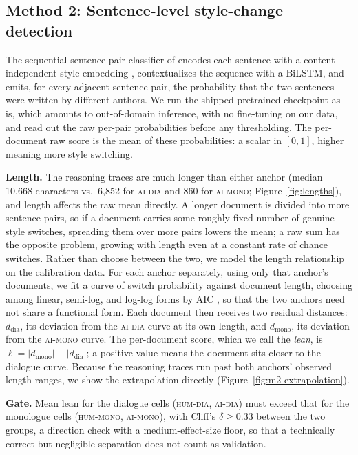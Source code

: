 \documentclass[11pt]{article}
\newcommand{\cellhm}{\textsc{hum-mono}}
\newcommand{\cellhd}{\textsc{hum-dia}}
\newcommand{\cellad}{\textsc{ai-dia}}
\newcommand{\cellam}{\textsc{ai-mono}}
\begin{document}
\subsection{Method 2: Sentence-level style-change detection}
\label{sec:method2}

The sequential sentence-pair classifier of \citet{schmidt2025sspc} encodes
each sentence with a content-independent style embedding
\citep{patel2025styledistance}, contextualizes the sequence with a BiLSTM,
and emits, for every adjacent sentence pair, the probability that the two
sentences were written by different authors. We run the shipped pretrained
checkpoint as is, which amounts to out-of-domain inference, with no
fine-tuning on our data, and read out the raw per-pair probabilities before
any thresholding.
The per-document raw score is the mean of these probabilities: a scalar in
$[0,1]$, higher meaning more style switching.

\textbf{Length.} The reasoning traces are much longer than either anchor
(median 10{,}668 characters vs.\ 6{,}852 for \cellad{} and 860 for \cellam{};
Figure~\ref{fig:lengths}), and length affects the raw mean directly. A longer
document is divided into more sentence pairs, so if a document carries some
roughly fixed number of genuine style switches, spreading them over more pairs
lowers the mean; a raw sum has the opposite problem, growing with length even
at a constant rate of chance switches. Rather than choose between the two, we
model the length relationship on the calibration data. For each anchor
separately, using only that anchor's documents, we fit a curve of switch
probability against document length, choosing among linear, semi-log, and
log-log forms by AIC \citep{akaike1974}, so that the two anchors need not share
a functional form. Each document then receives two residual distances:
$d_{\mathrm{dia}}$, its deviation from the \cellad{} curve at its own length,
and $d_{\mathrm{mono}}$, its deviation from the \cellam{} curve. The
per-document score, which we call the \emph{lean}, is
$\ell = |d_{\mathrm{mono}}| - |d_{\mathrm{dia}}|$; a positive value means the
document sits closer to the dialogue curve. Because the reasoning traces run
past both anchors' observed length ranges, we show the extrapolation directly
(Figure~\ref{fig:m2-extrapolation}).

\textbf{Gate.} Mean lean for the dialogue cells (\cellhd{}, \cellad{}) must
exceed that for the monologue cells (\cellhm{}, \cellam{}), with Cliff's
$\delta \geq 0.33$ \citep{cliff1993dominance} between the two groups, a
direction check with a medium-effect-size floor, so that a technically
correct but negligible separation does not count as validation.
\end{document}
